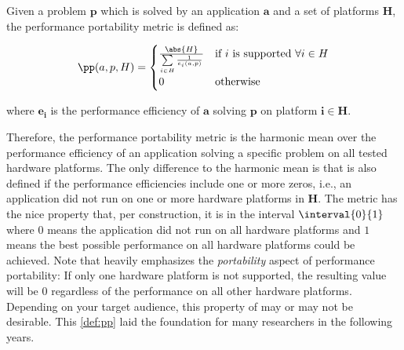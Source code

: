 \begin{definition}\label{def:pp}
    Given a problem $\mathbf{p}$ which is solved by an application $\mathbf{a}$ and a set of platforms $\mathbf{H}$, the performance portability metric \pp is defined as:

    \[ \pp(a, p, H) = 
        \begin{cases}
            \frac{\abs{H}}{\sum\limits_{i \in H} \frac{1}{e_i(a, p)}} & \text{if }i\text{ is supported } \forall i \in H \\
            0                                                         & \text{otherwise}
        \end{cases} 
    \]

    where $\mathbf{e_i}$ is the performance efficiency of $\mathbf{a}$ solving $\mathbf{p}$ on platform $\mathbf{i \in H}$.
\end{definition}

Therefore, the performance portability metric \pp is the harmonic mean over the performance efficiency of an application solving a specific problem on all tested hardware platforms. 
The only difference to the harmonic mean is that \pp is also defined if the performance efficiencies include one or more zeros, i.e., an application did not run on one or more hardware platforms in $\mathbf{H}$. 
The \pp metric has the nice property that, per construction, it is in the interval $\interval{0}{1}$ where $0$ means the application did not run on all hardware platforms and $1$ means the best possible performance on all hardware platforms could be achieved. 
Note that \pp heavily emphasizes the \textit{portability} aspect of performance portability: If only one hardware platform is not supported, the resulting \pp value will be $0$ regardless of the performance on all other hardware platforms. 
Depending on your target audience, this property of \pp may or may not be desirable. 
This \autoref{def:pp} laid the foundation for many researchers in the following years.
